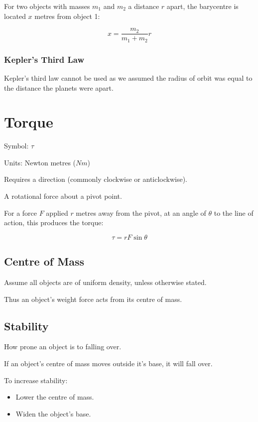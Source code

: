 \documentclass[a4paper,11pt]{article}
\begin{document}
For two objects with masses $m_1$ and $m_2$ a distance $r$ apart, the barycentre
is located $x$ metres from object 1:

$$
x = \frac{m_2}{m_1 + m_2} r
$$


\subsubsection{Kepler's Third Law}

Kepler's third law cannot be used as we assumed the radius of orbit was equal
to the distance the planets were apart.




\section{Torque}

Symbol: $\tau$

Units: Newton metres ($N m$)

Requires a direction (commonly clockwise or anticlockwise).

A rotational force about a pivot point.

For a force $F$ applied $r$ metres away from the pivot, at an angle of $\theta$
to the line of action, this produces the torque:

$$
\tau = rF \sin{\theta}
$$


\subsection{Centre of Mass}

Assume all objects are of uniform density, unless otherwise stated.

Thus an object's weight force acts from its centre of mass.


\subsection{Stability}

How prone an object is to falling over.

If an object's centre of mass moves outside it's base, it will fall over.

To increase stability:

\begin{itemize}
\item Lower the centre of mass.
\item Widen the object's base.
\end{itemize}
\end{document}
